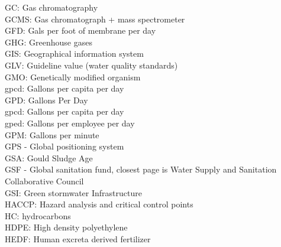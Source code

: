 GC:  Gas chromatography
\vspace{0.3cm}\\
GCMS:  Gas chromatograph + mass spectrometer
\vspace{0.3cm}\\
GFD:  Gals per foot of membrane per day 
\vspace{0.3cm}\\
GHG:  Greenhouse gases
\vspace{0.3cm}\\
GIS:  Geographical information system
\vspace{0.3cm}\\
GLV:  Guideline value (water quality standards)
\vspace{0.3cm}\\
GMO:  Genetically modified organism
\vspace{0.3cm}\\
gpcd:  Gallons per capita per day
\vspace{0.3cm}\\
GPD:  Gallons Per Day
\vspace{0.3cm}\\
gpcd:  Gallons per capita per day
\vspace{0.3cm}\\
gped:  Gallons per employee per day
\vspace{0.3cm}\\
GPM:  Gallons per minute
\vspace{0.3cm}\\
GPS - Global positioning system
\vspace{0.3cm}\\
GSA:  Gould Sludge Age
\vspace{0.3cm}\\
GSF - Global sanitation fund, closest page is Water Supply and Sanitation Collaborative Council
\vspace{0.3cm}\\
GSI:  Green stormwater Infrastructure
\vspace{0.3cm}\\
HACCP:  Hazard analysis and critical control points
\vspace{0.3cm}\\
HC:  hydrocarbons
\vspace{0.3cm}\\
HDPE:  High density polyethylene
\vspace{0.3cm}\\
HEDF:  Human excreta derived fertilizer
\vspace{0.3cm}\\
